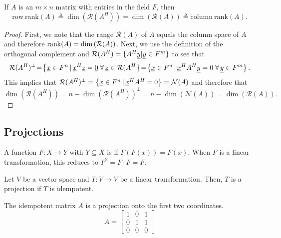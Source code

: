 \begin{corollary}
If $A$ is an $m \times n$ matrix with entries in the field $F$, then
\begin{equation*}
\mathrm{row~rank} (A) \triangleq \dim( \mathcal{R}(A^H)) =  \dim( \mathcal{R}(A)) \triangleq \mathrm{column~rank} (A).
\end{equation*}
\end{corollary}
\begin{proof}
First, we note that the range $\mathcal{R}(A)$ of $A$ equals the column space of $A$ and therefore $\mathrm{rank}(A) = \dim \left( \mathcal{R}(A) \right)$.
Next, we use the definition of the orthogonal complement and $\mathcal{R}(A^H) = \{ A^H \underline{y} | \underline{y} \in F^m \}$ to see that
\[ \mathcal{R}(A^H)^{\perp} \! = \! \left\{ \underline{x} \in F^n \, | \, \underline{x}^H \underline{z} = \underline{0} \; \forall \, \underline{z}\in \mathcal{R}(A^H \right\}
\! = \! \left\{ \underline{x} \in F^n \, | \, \underline{x}^H A^H \underline{y} = 0 \; \forall \, \underline{y}\in F^m \right\}. \]
This implies that $\mathcal{R}(A^H)^{\perp} =  \left\{ \underline{x} \in F^n \, | \, \underline{x}^H A^H = 0 \right\} = \mathcal{N}(A)$ and therefore that
\[ \dim\left( \mathcal{R}(A^H) \right) = n-\dim \left( \mathcal{R}(A^H) \right)^{\bot} = n - \dim \left(\mathcal{N}(A) \right) = \dim \left( \mathcal{R}(A) \right).\]
\end{proof}

\subsection{Projections}

\begin{definition}
A function $F: X \rightarrow Y$ with $Y \subseteq X$ is  if $F(F(x))=F(x)$.  When $F$ is a linear transformation, this reduces to $F^2 = F \cdot F = F$.
\end{definition}

\begin{definition}
Let $V$ be a vector space and $T: V \rightarrow V$ be a linear transformation.
Then, $T$ is a projection if $T$ is idempotent.
\end{definition}

\begin{example}
The idempotent matrix $A$ is a projection onto the first two coordinates.
\begin{equation*}
A = \left[
\begin{array}{ccc}
1 & 0 & 1 \\
0 & 1 & 1 \\
0 & 0 & 0
\end{array}
\right]
\end{equation*}
\end{example}

